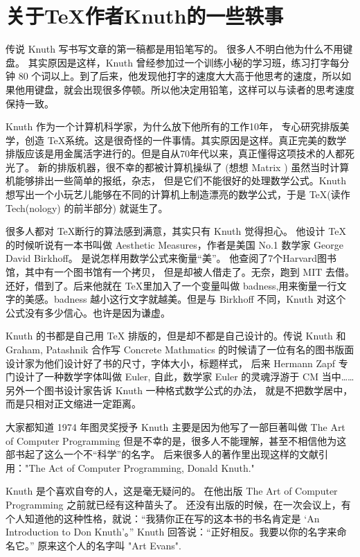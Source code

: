 \section{关于\TeX 作者Knuth的一些轶事}

传说 Knuth 写书写文章的第一稿都是用铅笔写的。 很多人不明白他为什么不用键盘。 其实原因是这样，Knuth 曾经参加过一个训练小秘的学习班，练习打字每分钟 80 个词以上。到了后来，他发现他打字的速度大大高于他思考的速度，所以如果他用键盘，就会出现很多停顿。所以他决定用铅笔，这样可以与读者的思考速度保持一致。 

Knuth 作为一个计算机科学家，为什么放下他所有的工作10年， 专心研究排版美学，创造 \TeX 系统。这是很奇怪的一件事情。其实原因是这样。真正完美的数学排版应该是用金属活字进行的。但是自从70年代以来，真正懂得这项技术的人都死光了。 新的排版机器，很不幸的都被计算机操纵了 (想想 Matrix ) 虽然当时计算机能够排出一些简单的报纸，杂志， 但是它们不能很好的处理数学公式。Knuth 想写出一个小玩艺儿能够在不同的计算机上制造漂亮的数学公式，于是 \TeX (读作 Tech(nology) 的前半部分) 就诞生了。 

很多人都对 \TeX 断行的算法感到满意，其实只有 Knuth 觉得担心。 他设计 \TeX 的时候听说有一本书叫做 Aesthetic Measures，作者是美国 No.1 数学家 George David Birkhoff。 是说怎样用数学公式来衡量“美”。 他查阅了7个Harvard图书馆，其中有一个图书馆有一个拷贝， 但是却被人借走了。无奈，跑到 MIT 去借。还好，借到了。后来他就在 \TeX 里加入了一个变量叫做 badness,用来衡量一行文字的美感。badness 越小这行文字就越美。但是与 Birkhoff 不同，Knuth 对这个公式没有多少信心。也许是因为谦虚。 

Knuth 的书都是自己用 TeX 排版的，但是却不都是自己设计的。传说 Knuth 和 Graham, Patashnik 合作写 Concrete Mathmatics 的时候请了一位有名的图书版面设计家为他们设计好了书的尺寸，字体大小，标题样式， 后来 Hermann Zapf 专门设计了一种数学字体叫做 Euler, 自此，数学家 Euler 的灵魂浮游于 CM 当中…… 另外一个图书设计家告诉 Knuth 一种格式数学公式的办法， 就是不把数学居中，而是只相对正文缩进一定距离。 


大家都知道 1974 年图灵奖授予 Knuth 主要是因为他写了一部巨著叫做 The Art of Computer Programming 但是不幸的是，很多人不能理解，甚至不相信他为这部书起了这么一个不“科学”的名字。 后来很多人的著作里出现这样的文献引用："The Act of Computer Programming, Donald Knuth." 

Knuth 是个喜欢自夸的人，这是毫无疑问的。 在他出版 The Art of Computer Programming 之前就已经有这种苗头了。 还没有出版的时候，在一次会议上，有个人知道他的这种性格，就说：“我猜你正在写的这本书的书名肯定是 ‘An Introduction to Don Knuth’。” Knuth 回答说：“正好相反。我要以你的名字来命名它。” 原来这个人的名字叫 "Art Evans". 

